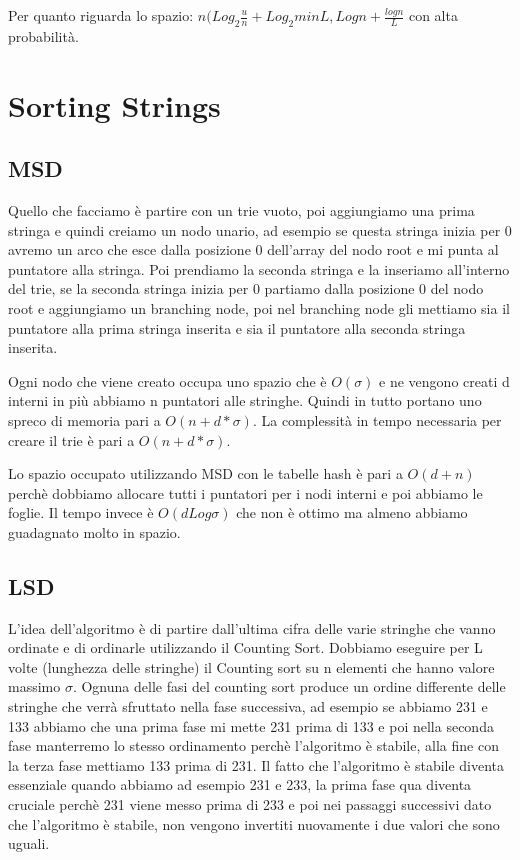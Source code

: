 \documentclass[12pt]{article}
\begin{document}
Per quanto riguarda lo spazio: $n(Log_2\frac{u}{n} + Log_2 min{L,Logn} + \frac{log n}{L}$ con alta probabilità.




\section{Sorting Strings}

\subsection{MSD}

Quello che facciamo è partire con un trie vuoto, poi aggiungiamo una prima stringa e quindi creiamo un nodo unario, ad esempio se questa stringa inizia per 0 avremo un arco che esce dalla posizione 0 dell'array del nodo root e mi punta al puntatore alla stringa.
Poi prendiamo la seconda stringa e la inseriamo all'interno del trie, se la seconda stringa inizia per 0 partiamo dalla posizione 0 del nodo root e aggiungiamo un branching node, poi nel branching node gli mettiamo sia il puntatore alla prima stringa inserita e sia il puntatore alla seconda stringa inserita.

Ogni nodo che viene creato occupa uno spazio che è $O(\sigma)$ e ne vengono creati d interni in più abbiamo n puntatori alle stringhe. Quindi in tutto portano uno spreco di memoria pari a $O(n+d*\sigma)$. La complessità in tempo necessaria per creare il trie è pari a $O(n+d*\sigma)$.

Lo spazio occupato utilizzando MSD con le tabelle hash è pari a $O(d+n)$ perchè dobbiamo allocare tutti i puntatori per i nodi interni e poi abbiamo le foglie.
Il tempo invece è $O(d Log \sigma)$ che non è ottimo ma almeno abbiamo guadagnato molto in spazio.

\subsection{LSD}

L'idea dell'algoritmo è di partire dall'ultima cifra delle varie stringhe che vanno ordinate e di ordinarle utilizzando il Counting Sort. Dobbiamo eseguire per L volte (lunghezza delle stringhe) il Counting sort su n elementi che hanno valore massimo $\sigma$. Ognuna delle fasi del counting sort produce un ordine differente delle stringhe che verrà sfruttato nella fase successiva, ad esempio se abbiamo 231 e 133 abbiamo che una prima fase mi mette 231 prima di 133 e poi nella seconda fase manterremo lo stesso ordinamento perchè l'algoritmo è stabile, alla fine con la terza fase mettiamo 133 prima di 231. Il fatto che l'algoritmo è stabile diventa essenziale quando abbiamo ad esempio 231 e 233, la prima fase qua diventa cruciale perchè 231 viene messo prima di 233 e poi nei passaggi successivi dato che l'algoritmo è stabile, non vengono invertiti nuovamente i due valori che sono uguali.
\end{document}
